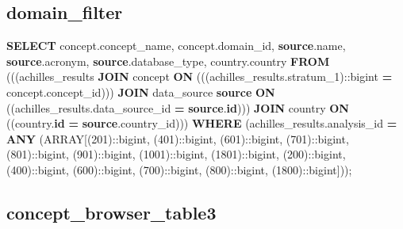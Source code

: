 \documentclass[
]{book}
\newenvironment{Shaded}{\begin{snugshade}}{\end{snugshade}}
\newcommand{\CharTok}[1]{\textcolor[rgb]{0.31,0.60,0.02}{#1}}
\newcommand{\DataTypeTok}[1]{\textcolor[rgb]{0.13,0.29,0.53}{#1}}
\newcommand{\DecValTok}[1]{\textcolor[rgb]{0.00,0.00,0.81}{#1}}
\newcommand{\KeywordTok}[1]{\textcolor[rgb]{0.13,0.29,0.53}{\textbf{#1}}}
\newcommand{\NormalTok}[1]{#1}
\newcommand{\OperatorTok}[1]{\textcolor[rgb]{0.81,0.36,0.00}{\textbf{#1}}}
\begin{document}
\hypertarget{domain_filter}{%
\subsection*{domain\_filter}\label{domain_filter}}

\begin{Shaded}
\begin{Highlighting}[]
\KeywordTok{SELECT}\NormalTok{ concept.concept\_name,}
\NormalTok{   concept.domain\_id,}
   \KeywordTok{source}\NormalTok{.name,}
   \KeywordTok{source}\NormalTok{.acronym,}
   \KeywordTok{source}\NormalTok{.database\_type,}
\NormalTok{   country.country}
  \KeywordTok{FROM}\NormalTok{ (((achilles\_results}
    \KeywordTok{JOIN}\NormalTok{ concept }\KeywordTok{ON}\NormalTok{ (((achilles\_results.stratum\_1):}\CharTok{:bigint} \OperatorTok{=}\NormalTok{ concept.concept\_id)))}
    \KeywordTok{JOIN}\NormalTok{ data\_source }\KeywordTok{source} \KeywordTok{ON}\NormalTok{ ((achilles\_results.data\_source\_id }\OperatorTok{=} \KeywordTok{source}\NormalTok{.}\KeywordTok{id}\NormalTok{)))}
    \KeywordTok{JOIN}\NormalTok{ country }\KeywordTok{ON}\NormalTok{ ((country.}\KeywordTok{id} \OperatorTok{=} \KeywordTok{source}\NormalTok{.country\_id)))}
 \KeywordTok{WHERE}\NormalTok{ (achilles\_results.analysis\_id }\OperatorTok{=} \KeywordTok{ANY}\NormalTok{ (}\DataTypeTok{ARRAY}\NormalTok{[(}\DecValTok{201}\NormalTok{):}\CharTok{:bigint}\NormalTok{, (}\DecValTok{401}\NormalTok{):}\CharTok{:bigint}\NormalTok{, (}\DecValTok{601}\NormalTok{):}\CharTok{:bigint}\NormalTok{, (}\DecValTok{701}\NormalTok{):}\CharTok{:bigint}\NormalTok{, (}\DecValTok{801}\NormalTok{):}\CharTok{:bigint}\NormalTok{, (}\DecValTok{901}\NormalTok{):}\CharTok{:bigint}\NormalTok{, (}\DecValTok{1001}\NormalTok{):}\CharTok{:bigint}\NormalTok{, (}\DecValTok{1801}\NormalTok{):}\CharTok{:bigint}\NormalTok{, (}\DecValTok{200}\NormalTok{):}\CharTok{:bigint}\NormalTok{, (}\DecValTok{400}\NormalTok{):}\CharTok{:bigint}\NormalTok{, (}\DecValTok{600}\NormalTok{):}\CharTok{:bigint}\NormalTok{, (}\DecValTok{700}\NormalTok{):}\CharTok{:bigint}\NormalTok{, (}\DecValTok{800}\NormalTok{):}\CharTok{:bigint}\NormalTok{, (}\DecValTok{1800}\NormalTok{):}\CharTok{:bigint}\NormalTok{]));}
\end{Highlighting}
\end{Shaded}

\hypertarget{concept_browser_table3}{%
\subsection*{concept\_browser\_table3}\label{concept_browser_table3}}
\end{document}
